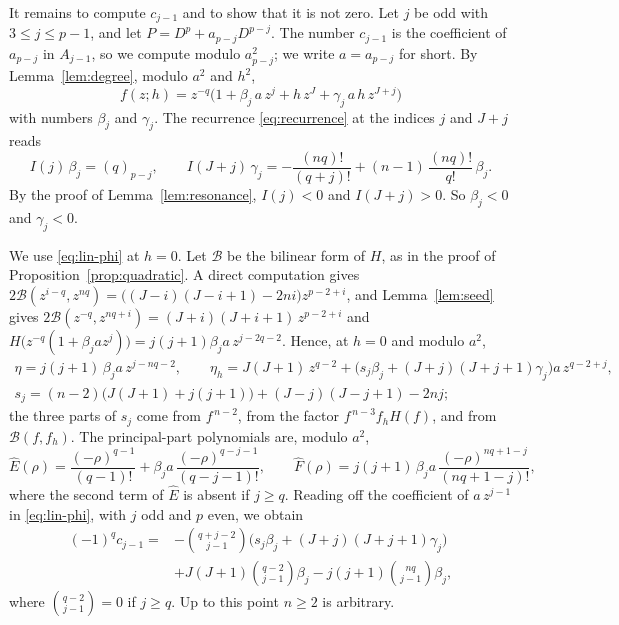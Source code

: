 \documentclass[11pt]{article}
\theoremstyle{definition}
\theoremstyle{remark}
\numberwithin{equation}{section}
\newcommand{\hatt}[1]{\widehat{#1}}
\newcommand{\Bil}{\mathcal B}
\begin{document}
It remains to compute \(c_{j-1}\) and to show that it is not zero. Let
\(j\) be odd with \(3\le j\le p-1\), and let
\(P=D^p+a_{p-j}D^{p-j}\). The number \(c_{j-1}\) is the coefficient of
\(a_{p-j}\) in \(A_{j-1}\), so we compute modulo \(a_{p-j}^2\); we write
\(a=a_{p-j}\) for short. By Lemma~\ref{lem:degree}, modulo \(a^2\) and
\(h^2\),
\[
 f(z;h)=z^{-q}\bigl(1+\beta_j\,a\,z^{j}+h\,z^{J}+\gamma_j\,a\,h\,z^{J+j}\bigr)
\]
with numbers \(\beta_j\) and \(\gamma_j\). The recurrence
\eqref{eq:recurrence} at the indices \(j\) and \(J+j\) reads
\[
 I(j)\,\beta_j=(q)_{p-j},\qquad
 I(J+j)\,\gamma_j=-\frac{(nq)!}{(q+j)!}+(n-1)\,\frac{(nq)!}{q!}\,\beta_j .
\]
By the proof of Lemma~\ref{lem:resonance}, \(I(j)<0\) and \(I(J+j)>0\).
So \(\beta_j<0\) and \(\gamma_j<0\).

We use \eqref{eq:lin-phi} at \(h=0\). Let \(\Bil\) be the bilinear form
of \(H\), as in the proof of Proposition~\ref{prop:quadratic}. A direct
computation gives
\(2\Bil(z^{i-q},z^{nq})=\bigl((J-i)(J-i+1)-2ni\bigr)z^{p-2+i}\), and
Lemma~\ref{lem:seed} gives
\(2\Bil(z^{-q},z^{nq+i})=(J+i)(J+i+1)\,z^{p-2+i}\) and
\(H\bigl(z^{-q}(1+\beta_ja z^j)\bigr)=j(j+1)\beta_ja\,z^{j-2q-2}\).
Hence, at \(h=0\) and modulo \(a^2\),
\begin{gather*}
 \eta=j(j+1)\,\beta_ja\,z^{j-nq-2},\qquad
 \eta_h=J(J+1)\,z^{q-2}+\bigl(s_j\beta_j+(J+j)(J+j+1)\gamma_j\bigr)a\,z^{q-2+j},\\
 s_j=(n-2)\bigl(J(J+1)+j(j+1)\bigr)+(J-j)(J-j+1)-2nj ;
\end{gather*}
the three parts of \(s_j\) come from \(f^{\,n-2}\), from the factor
\(f^{\,n-3}f_hH(f)\), and from \(\Bil(f,f_h)\). The principal-part
polynomials are, modulo \(a^2\),
\[
 \hatt E(\rho)=\frac{(-\rho)^{q-1}}{(q-1)!}
 +\beta_ja\,\frac{(-\rho)^{q-j-1}}{(q-j-1)!},\qquad
 \hatt F(\rho)=j(j+1)\,\beta_ja\,\frac{(-\rho)^{nq+1-j}}{(nq+1-j)!},
\]
where the second term of \(\hatt E\) is absent if \(j\ge q\). Reading
off the coefficient of \(a\,z^{j-1}\) in \eqref{eq:lin-phi}, with
\(j\) odd and \(p\) even, we obtain
\begin{equation}\label{eq:first-odd}
\begin{aligned}
 (-1)^{q}c_{j-1}={}&-\binom{q+j-2}{j-1}\bigl(s_j\beta_j+(J+j)(J+j+1)\gamma_j\bigr)\\
 &+J(J+1)\binom{q-2}{j-1}\beta_j-j(j+1)\binom{nq}{j-1}\beta_j ,
\end{aligned}
\end{equation}
where \(\binom{q-2}{j-1}=0\) if \(j\ge q\). Up to this point \(n\ge2\)
is arbitrary.
\end{document}
